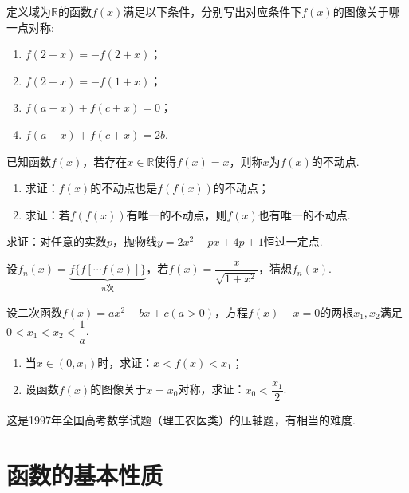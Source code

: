 \documentclass[lang=cn,math=cm,chinesefont=nofont,11pt,scheme=chinese,twocol]{elegantbook}
\begin{document}
\begin{exercise}
  定义域为$\mathbb{R}$的函数$f(x)$满足以下条件，分别写出对应条件下$f(x)$的图像关于哪一点对称:
\end{exercise}

\begin{enumerate}
  \item $f(2-x)=-f(2+x)$；
  \item $f(2-x)=-f(1+x)$；
  \item $f(a-x)+f(c+x)=0$；
  \item $f(a-x)+f(c+x)=2b$.
\end{enumerate}

\begin{exercise}
  已知函数$f(x)$，若存在$x\in\mathbb{R}$使得$f(x)=x$，则称$x$为$f(x)$的不动点.
\end{exercise}

\begin{enumerate}
  \item 求证：$f(x)$的不动点也是$f(f(x))$的不动点；
  \item 求证：若$f(f(x))$有唯一的不动点，则$f(x)$也有唯一的不动点.
\end{enumerate}

\begin{exercise}\label{ASJC_G1_P22.5}
  求证：对任意的实数$p$，抛物线$y=2x^2-px+4p+1$恒过一定点.
\end{exercise}

\begin{exercise}
  设$f_n(x)=\underbrace{f\{f[\cdots f(x)]\}}_{n\text{次}}$，若$f(x)=\dfrac{x}{\sqrt{1+x^2}}$，猜想$f_n(x)$.
\end{exercise}

\begin{exercise}
  设二次函数$f(x)=ax^{2}+bx+c(a>0)$，方程$f(x)-x=0$的两根$x_1,x_2$满足$0<x_1<x_2<\dfrac1a$.
\end{exercise}

\begin{enumerate}
  \item 当$x\in(0,x_1)$时，求证：$x<f(x)<x_1$；
  \item 设函数$f(x)$的图像关于$x=x_0$对称，求证：$x_0<\dfrac{x_1}{2}$.
\end{enumerate}

\begin{remark}
  这是1997年全国高考数学试题（理工农医类）的压轴题，有相当的难度.
\end{remark}

\section{函数的基本性质}
\end{document}
